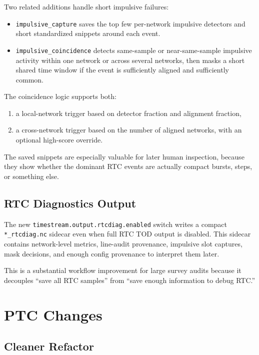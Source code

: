\documentclass[11pt]{article}
\begin{document}
Two related additions handle short impulsive failures:

\begin{itemize}[leftmargin=1.5em]
\item \texttt{impulsive\_capture} saves the top few per-network impulsive
detectors and short standardized snippets around each event.
\item \texttt{impulsive\_coincidence} detects same-sample or near-same-sample
impulsive activity within one network or across several networks, then masks a
short shared time window if the event is sufficiently aligned and sufficiently
common.
\end{itemize}

The coincidence logic supports both:

\begin{enumerate}[leftmargin=1.5em]
\item a local-network trigger based on detector fraction and alignment fraction,
\item a cross-network trigger based on the number of aligned networks, with an
optional high-score override.
\end{enumerate}

The saved snippets are especially valuable for later human inspection, because
they show whether the dominant RTC events are actually compact bursts, steps,
or something else.

\subsection{RTC Diagnostics Output}

The new \texttt{timestream.output.rtcdiag.enabled} switch writes a compact
\texttt{*\_rtcdiag.nc} sidecar even when full RTC TOD output is disabled. This
sidecar contains network-level metrics, line-audit provenance, impulsive slot
captures, mask decisions, and enough config provenance to interpret them later.

This is a substantial workflow improvement for large survey audits because it
decouples ``save all RTC samples'' from ``save enough information to debug RTC.''

\section{PTC Changes}

\subsection{Cleaner Refactor}
\end{document}
